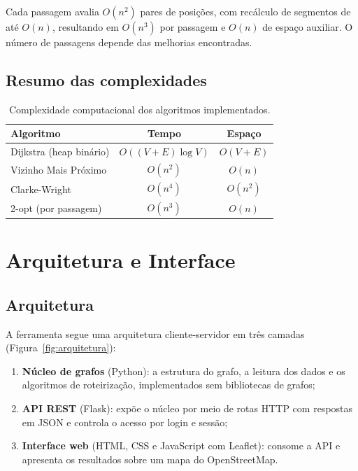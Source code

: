 \documentclass[12pt]{article}
\begin{document}
Cada passagem avalia $O(n^2)$ pares de posições, com recálculo de segmentos de até
$O(n)$, resultando em $O(n^3)$ por passagem e $O(n)$ de espaço auxiliar. O número de
passagens depende das melhorias encontradas.

\subsection{Resumo das complexidades}

\begin{table}[htbp]
\centering
\caption{Complexidade computacional dos algoritmos implementados.}
\label{tab:complexidade}
\begin{tabular}{lcc}
\toprule
Algoritmo & Tempo & Espaço \\
\midrule
Dijkstra (heap binário)      & $O((V+E)\log V)$ & $O(V+E)$ \\
Vizinho Mais Próximo         & $O(n^2)$         & $O(n)$ \\
Clarke-Wright                & $O(n^4)$         & $O(n^2)$ \\
2-opt (por passagem)         & $O(n^3)$         & $O(n)$ \\
\bottomrule
\end{tabular}
\end{table}

\section{Arquitetura e Interface}\label{sec:arquitetura}

\subsection{Arquitetura}

A ferramenta segue uma arquitetura cliente-servidor em três camadas
(Figura~\ref{fig:arquitetura}):
\begin{enumerate}
  \item \textbf{Núcleo de grafos} (Python): a estrutura do grafo, a leitura dos
        dados e os algoritmos de roteirização, implementados sem bibliotecas de grafos;
  \item \textbf{API REST} (Flask): expõe o núcleo por meio de rotas HTTP com
        respostas em JSON e controla o acesso por login e sessão;
  \item \textbf{Interface web} (HTML, CSS e JavaScript com Leaflet): consome a API e
        apresenta os resultados sobre um mapa do OpenStreetMap.
\end{enumerate}
\end{document}
